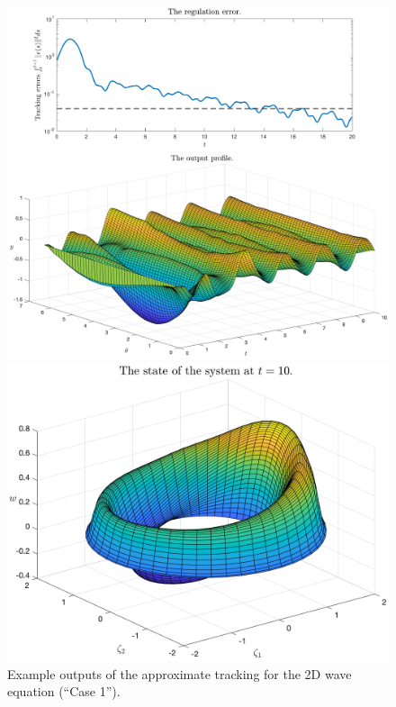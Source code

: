 \documentclass[11pt, a4paper]{amsart}
\theoremstyle{definition}
\numberwithin{equation}{section}
\begin{document}
\begin{figure}[h!]
  \centering
  \begin{minipage}{0.48\linewidth}
    \begin{flushleft}
      \includegraphics[width=0.95\linewidth]{W2D1error.pdf}

      \includegraphics[width=0.95\linewidth]{W2D1output.png}
    \end{flushleft}
  \end{minipage}
  \begin{minipage}{0.48\linewidth}
    \begin{flushright}
      \includegraphics[width=0.95\linewidth]{W2D1profile.png}
    \end{flushright}
  \end{minipage}

    \caption{Example outputs of the approximate tracking for the 2D wave equation (``Case 1'').}
  \label{fig:2Dwave1}
\end{figure}
\end{document}
